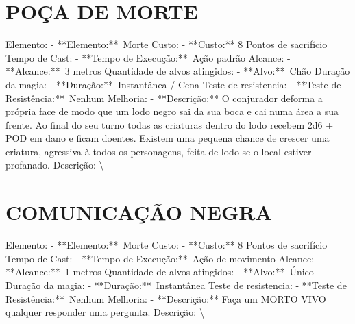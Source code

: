 \documentclass{article}%
\begin{document}
\section{POÇA DE MORTE}%
\label{sec:POADEMORTE}%
Elemento: {-} **Elemento:**~Morte\newline%
Custo: {-} **Custo:** 8 Pontos de sacrifício\newline%
Tempo de Cast: {-} **Tempo de Execução:**~Ação padrão\newline%
Alcance: {-} **Alcance:**~3 metros\newline%
Quantidade de alvos atingidos: {-} **Alvo:**~Chão\newline%
Duração da magia: {-} **Duração:**~Instantânea / Cena\newline%
Teste de resistencia: {-} **Teste de Resistência:**~Nenhum\newline%
Melhoria: {-} **Descrição:** O conjurador deforma a própria face de modo que um lodo negro sai da sua boca e cai numa área a sua frente. Ao final do seu turno todas as criaturas dentro do lodo recebem 2d6 + POD em dano e ficam doentes. Existem uma pequena chance de crescer uma criatura, agressiva à todos os personagens, feita de lodo se o local estiver profanado.\newline%
Descrição: \textbackslash{}

%
\section{COMUNICAÇÃO NEGRA}%
\label{sec:COMUNICAONEGRA}%
Elemento: {-} **Elemento:**~Morte\newline%
Custo: {-} **Custo:** 8 Pontos de sacrifício\newline%
Tempo de Cast: {-} **Tempo de Execução:**~Ação de movimento\newline%
Alcance: {-} **Alcance:**~1 metros\newline%
Quantidade de alvos atingidos: {-} **Alvo:**~Único\newline%
Duração da magia: {-} **Duração:**~Instantânea\newline%
Teste de resistencia: {-} **Teste de Resistência:**~Nenhum\newline%
Melhoria: {-} **Descrição:** Faça um MORTO VIVO qualquer responder uma pergunta.\newline%
Descrição: \textbackslash{}

%
\end{document}
